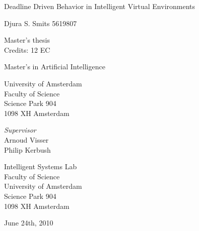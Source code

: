 \documentclass[11pt]{book}
\begin{document}
\begin{center}

\vspace{2.5cm}

\begin{Huge}
Deadline Driven Behavior in Intelligent Virtual Environments
\end{Huge}

\vspace{1.5cm}

Djura S. Smits
5619807

\vspace{1.5cm}

Master's thesis\\
Credits: 12 EC

\vspace{0.5cm}

Master's in Artificial Intelligence

\vspace{0.25cm}

University of Amsterdam\\
Faculty of Science\\
Science Park 904\\
1098 XH Amsterdam

\vspace{4cm}

\emph{Supervisor}\\
Arnoud Visser\\
Philip Kerbush

\vspace{0.25cm}

Intelligent Systems Lab\\
Faculty of Science\\
University of Amsterdam\\
Science Park 904\\
1098 XH  Amsterdam

\vspace{1.5cm}

June 24th, 2010

\end{center}
\newpage
\end{document}
